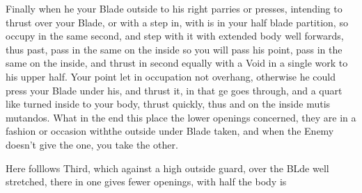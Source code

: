 Finally when he your Blade outside to his right parries or presses,
intending to thrust over your Blade, or with a step in, with is in
your half blade partition, so occupy in the same second, and step with
it with extended body well forwards, thus past, pass in the same on
the inside so you will pass his point, pass in the same on the inside,
and thrust in second equally with a Void in a single work to his upper
half. Your point let in occupation not overhang, otherwise he could
press your Blade under his, and thrust it, in that ge goes through,
and a quart like turned inside to your body, thrust quickly, thus and
on the inside mutis mutandos. What in the end this place the lower
openings concerned, they are in a fashion or occasion withthe outside
under Blade taken, and when the Enemy doesn't give the one, you take
the other.


Here folllows Third, which against a high outside guard, over the BLde
well stretched, there in one gives fewer openings, with half the body is
